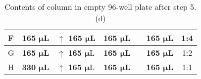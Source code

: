 \documentclass[12pt, letterpaper]{article}
\begin{document}
\begin{table}[h]
\begin{tabular}{|l|l|l|l|l|l|c|}
    F & \textbf{165 $\bm{\mu}$L}    & $\uparrow$ \textbf{165 $\bm{\mu}$}L & \textbf{165 $\bm{\mu}$L}                                                       &                                                                              & \textbf{165 $\bm{\mu}$L}   & 1:4                                                       \\ \hline
    G & \textbf{165 $\bm{\mu}$L}    & $\uparrow$ \textbf{165 $\bm{\mu}$}L & \textbf{165 $\bm{\mu}$L}                                                       &                                                                              & \textbf{165 $\bm{\mu}$L}   & 1:2                                                       \\ \hline
    H & \textbf{330 $\bm{\mu}$L}    & $\uparrow$ \textbf{165 $\bm{\mu}$}L & \textbf{165 $\bm{\mu}$L}                                                       &                                                                              & \textbf{165 $\bm{\mu}$L}   & 1:1                                                       \\ \hline
    \end{tabular}
    \caption{Contents of column in empty 96-well plate after step 5.(d)}
    \label{tab:my-table}
\end{table}
\end{document}
